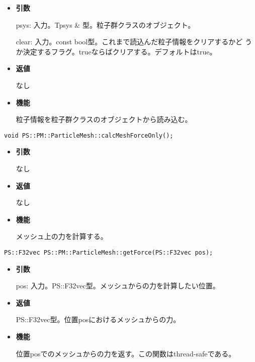 \begin{itemize}

\item {\bf 引数}

  psys: 入力。Tpsys \& 型。粒子群クラスのオブジェクト。

  clear: 入力。const bool型。これまで読込んだ粒子情報をクリアするかど
  うか決定するフラグ。trueならばクリアする。デフォルトはtrue。

\item {\bf 返値}

  なし

\item {\bf 機能}

  粒子情報を粒子群クラスのオブジェクトから読み込む。

\end{itemize}


\begin{screen}
\begin{verbatim}
void PS::PM::ParticleMesh::calcMeshForceOnly();
\end{verbatim}
\end{screen}

\begin{itemize}

\item {\bf 引数}

  なし

\item {\bf 返値}

  なし

\item {\bf 機能}

  メッシュ上の力を計算する。

\end{itemize}


\begin{screen}
\begin{verbatim}
PS::F32vec PS::PM::ParticleMesh::getForce(PS::F32vec pos);
\end{verbatim}
\end{screen}

\begin{itemize}

\item {\bf 引数}

  pos: 入力。PS::F32vec型。メッシュからの力を計算したい位置。

\item {\bf 返値}

  PS::F32vec型。位置posにおけるメッシュからの力。

\item {\bf 機能}

  位置posでのメッシュからの力を返す。この関数はthread-safeである。

\end{itemize}

